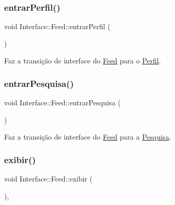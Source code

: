 \mbox{\label{class_interface_1_1_feed_a7cd09ff01bc220faeac98b0afdea1480}} 
\subsubsection{\texorpdfstring{entrar\+Perfil()}{entrarPerfil()}}
{\footnotesize\ttfamily void Interface\+::\+Feed\+::entrar\+Perfil (\begin{DoxyParamCaption}{ }\end{DoxyParamCaption})\hspace{0.3cm}{\ttfamily [private]}}



Faz a transição de interface do \hyperlink{class_interface_1_1_feed}{Feed} para o \hyperlink{class_interface_1_1_perfil}{Perfil}. 

\mbox{\label{class_interface_1_1_feed_a75debf14bea8ae75c74599b117b8af5c}} 
\subsubsection{\texorpdfstring{entrar\+Pesquisa()}{entrarPesquisa()}}
{\footnotesize\ttfamily void Interface\+::\+Feed\+::entrar\+Pesquisa (\begin{DoxyParamCaption}{ }\end{DoxyParamCaption})\hspace{0.3cm}{\ttfamily [private]}}



Faz a transição de interface do \hyperlink{class_interface_1_1_feed}{Feed} para a \hyperlink{class_interface_1_1_pesquisa}{Pesquisa}. 

\mbox{\label{class_interface_1_1_feed_a8ba454c1afcb942a84bfd9d918cf262c}} 
\subsubsection{\texorpdfstring{exibir()}{exibir()}}
{\footnotesize\ttfamily void Interface\+::\+Feed\+::exibir (\begin{DoxyParamCaption}{ }\end{DoxyParamCaption})\hspace{0.3cm}{\ttfamily [override]}, {\ttfamily [virtual]}}



